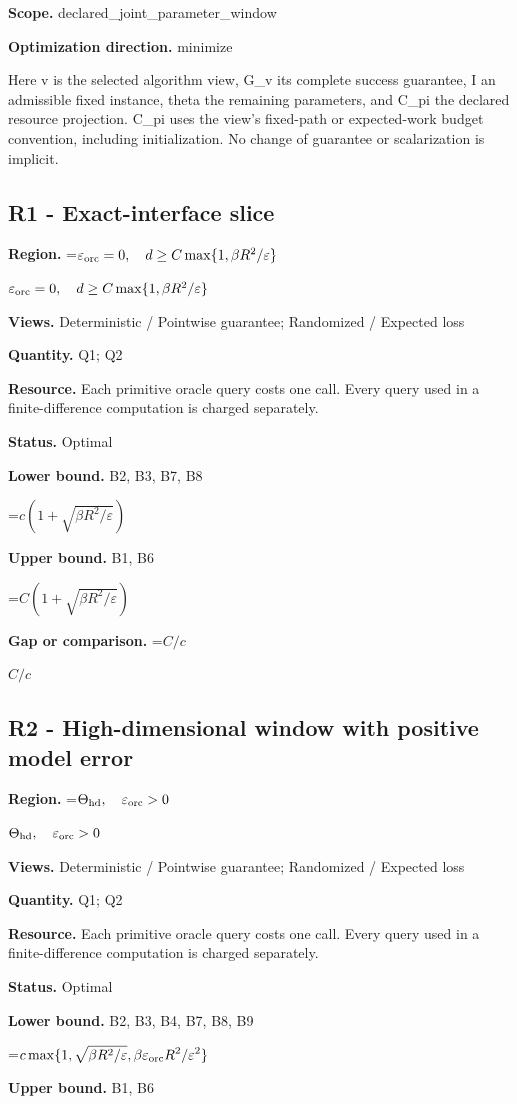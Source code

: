 \documentclass[10pt,a4paper]{article}
\newcommand{\AtlasMath}[1]{\par\begingroup\centering\setbox0=\hbox{$\displaystyle #1$}\ifdim\wd0>1.4\linewidth\typeout{ATLAS WIDE FORMULA: \the\wd0}\fi\ifdim\wd0>\linewidth\resizebox{\linewidth}{!}{\box0}\else\box0\fi\par\endgroup}
\newcommand{\AtlasInlineMath}[1]{\begingroup\setbox0=\hbox{$#1$}\ifdim\wd0>.4\linewidth\endgroup\AtlasMath{#1}\else\endgroup$#1$\fi}
\begin{document}
\textbf{Scope.} declared\_joint\_parameter\_window

\textbf{Optimization direction.} minimize

Here v is the selected algorithm view, G\_v its complete success guarantee, I an admissible fixed instance, theta the remaining parameters, and C\_pi the declared resource projection. C\_pi uses the view's fixed-path or expected-work budget convention, including initialization. No change of guarantee or scalarization is implicit.

\subsection{R1 - Exact-interface slice}
\textbf{Region.} \AtlasInlineMath{\varepsilon_{\rm orc}=0,\quad d\ge C\max\{1,\beta R^2/\varepsilon\}}

\textbf{Views.} Deterministic / Pointwise guarantee; Randomized / Expected loss

\textbf{Quantity.} Q1; Q2

\textbf{Resource.} Each primitive oracle query costs one call. Every query used in a finite-difference computation is charged separately.

\textbf{Status.} Optimal

\textbf{Lower bound.} B2, B3, B7, B8

\AtlasMath{c(1+\sqrt{\beta R^2/\varepsilon})}
\textbf{Upper bound.} B1, B6

\AtlasMath{C(1+\sqrt{\beta R^2/\varepsilon})}
\textbf{Gap or comparison.} \AtlasInlineMath{C/c}

\subsection{R2 - High-dimensional window with positive model error}
\textbf{Region.} \AtlasInlineMath{\Theta_{\rm hd},\quad\varepsilon_{\rm orc}>0}

\textbf{Views.} Deterministic / Pointwise guarantee; Randomized / Expected loss

\textbf{Quantity.} Q1; Q2

\textbf{Resource.} Each primitive oracle query costs one call. Every query used in a finite-difference computation is charged separately.

\textbf{Status.} Optimal

\textbf{Lower bound.} B2, B3, B4, B7, B8, B9

\AtlasMath{c\max\{1,\sqrt{\beta R^2/\varepsilon},\beta\varepsilon_{\rm orc}R^2/\varepsilon^2\}}
\textbf{Upper bound.} B1, B6
\end{document}
